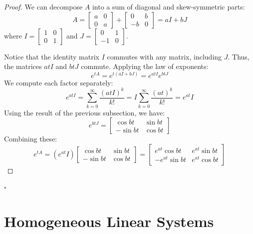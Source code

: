 \documentclass[12pt,a4paper]{report}
\theoremstyle{definition}
\numberwithin{equation}{chapter}
\begin{document}
\begin{proof}
We can decompose $A$ into a sum of diagonal and skew-symmetric parts:
\begin{equation}
A = \begin{bmatrix} a & 0 \\ 0 & a \end{bmatrix} + \begin{bmatrix} 0 & b \\ -b & 0 \end{bmatrix} = a I + b J
\end{equation}
where $I = \begin{bmatrix} 1 & 0 \\ 0 & 1 \end{bmatrix}$ and $J = \begin{bmatrix} 0 & 1 \\ -1 & 0 \end{bmatrix}$. 

Notice that the identity matrix $I$ commutes with any matrix, including $J$. Thus, the matrices $atI$ and $btJ$ commute. Applying the law of exponents:
\begin{equation}
e^{tA} = e^{t(aI + bJ)} = e^{atI} e^{btJ}
\end{equation}
We compute each factor separately:
\begin{equation}
e^{atI} = \sum_{k=0}^\infty \frac{(atI)^k}{k!} = I \sum_{k=0}^\infty \frac{(at)^k}{k!} = e^{at} I
\end{equation}
Using the result of the previous subsection, we have:
\begin{equation}
e^{btJ} = \begin{bmatrix} \cos bt & \sin bt \\ -\sin bt & \cos bt \end{bmatrix}
\end{equation}
Combining these:
\begin{equation}
e^{tA} = (e^{at} I) \begin{bmatrix} \cos bt & \sin bt \\ -\sin bt & \cos bt \end{bmatrix} = \begin{bmatrix} e^{at}\cos bt & e^{at}\sin bt \\ -e^{at}\sin bt & e^{at}\cos bt \end{bmatrix}
\end{equation}
\end{proof}
\hfill $\square$


\chapter{Homogeneous Linear Systems}
\end{document}
